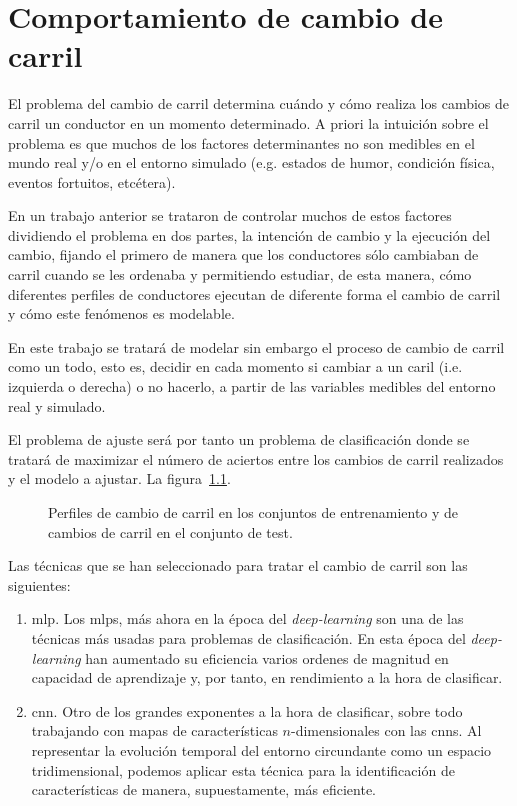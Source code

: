 \chapter{Comportamiento de cambio de carril}
\label{ch:lane-change-model}

El problema del cambio de carril determina cuándo y cómo realiza los cambios de carril un conductor en un momento determinado. A priori la intuición sobre el problema es que muchos de los factores determinantes no son medibles en el mundo real y/o en el entorno simulado (e.g. estados de humor, condición física, eventos fortuitos, etcétera).

En un trabajo anterior\cite{CITA DEL ARTÍCULO DE LANE EXECUTION CUANDO NOS LO PUBLIQUEN} se trataron de controlar muchos de estos factores dividiendo el problema en dos partes, la intención de cambio y la ejecución del cambio, fijando el primero de manera que los conductores sólo cambiaban de carril cuando se les ordenaba y permitiendo estudiar, de esta manera, cómo diferentes perfiles de conductores ejecutan de diferente forma el cambio de carril y cómo este fenómenos es modelable.

En este trabajo se tratará de modelar sin embargo el proceso de cambio de carril como un todo, esto es, decidir en cada momento si cambiar a un caril (i.e. izquierda o derecha) o no hacerlo, a partir de las variables medibles del entorno real y simulado.

El problema de ajuste será por tanto un problema de clasificación donde se tratará de maximizar el número de aciertos entre los cambios de carril realizados y el modelo a ajustar. La figura~\ref{fig:lc-lane-change-profiles}.

\begin{figure}
	\centering
	\qquad
	\caption[Perfiles de cambios de carril en los conjuntos de entrenamiento y test]{Perfiles de cambio de carril en los conjuntos de entrenamiento y de cambios de carril en el conjunto de test. }
	\label{fig:lc-lane-change-profiles}
\end{figure}

Las técnicas que se han seleccionado para tratar el cambio de carril son las siguientes:

\begin{enumerate}
	\item \ac{mlp}. Los \acp{mlp}, más ahora en la época del \textit{deep-learning} son una de las técnicas más usadas para problemas de clasificación. En esta época del \textit{deep-learning} han aumentado su eficiencia varios ordenes de magnitud en capacidad de aprendizaje y, por tanto, en rendimiento a la hora de clasificar.
	\item \ac{cnn}. Otro de los grandes exponentes a la hora de clasificar, sobre todo trabajando con mapas de características $n$-dimensionales con las \acp{cnn}. Al representar la evolución temporal del entorno circundante como un espacio tridimensional, podemos aplicar esta técnica para la identificación de características de manera, supuestamente, más eficiente.
\end{enumerate}


